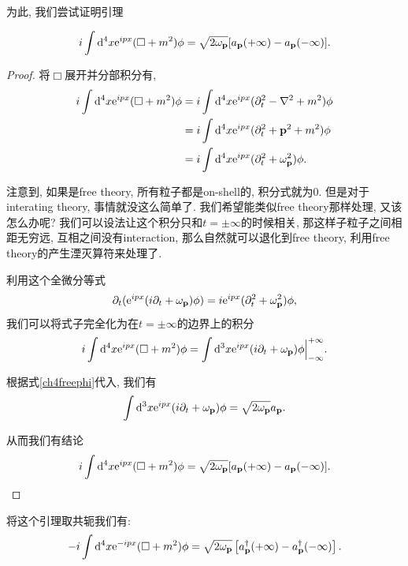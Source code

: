 为此, 我们尝试证明引理
\begin{lemma}
    \begin{equation}
        i\int\mathrm d^4x\mathrm e^{ipx}(\Box+m^2)\phi=\sqrt{2\omega_{\mathbf{p}}}[a_{\mathbf{p}}(+\infty)-a_{\mathbf{p}}(-\infty)].
    \end{equation}
\end{lemma}
\begin{proof}
    将$\Box$展开并分部积分有,
    \begin{align}
        i\int\mathrm d^4x\mathrm e^{ipx}(\Box+m^2)\phi&=i\int\mathrm d^4x\mathrm e^{ipx}(\partial_t^2-\nabla^2+m^2)\phi\\
        &=i\int\mathrm d^4x\mathrm e^{ipx}(\partial_t^2+\mathbf{p}^2+m^2)\phi\\
        &=i\int\mathrm d^4x\mathrm e^{ipx}(\partial_t^2+\omega_{\mathbf{p}}^2)\phi.
    \end{align}

    注意到, 如果是free theory, 所有粒子都是on-shell的, 积分式就为$0$. 但是对于interating theory, 事情就没这么简单了. 我们希望能类似free theory那样处理, 又该怎么办呢? 我们可以设法让这个积分只和$t=\pm\infty$的时候相关, 那这样子粒子之间相距无穷远, 互相之间没有interaction, 那么自然就可以退化到free theory, 利用free theory的产生湮灭算符来处理了.

    利用这个全微分等式\cite{schwartz-lsz}
    \begin{equation}
        \partial_t(\mathrm e^{ipx}(i\partial_t+\omega_{\mathbf{p}})\phi)=i\mathrm e^{ipx}(\partial_t^2+\omega_{\mathbf{p}}^2)\phi,
    \end{equation}
    我们可以将式子完全化为在$t=\pm\infty$的边界上的积分
    \begin{equation}
        i\int\mathrm d^4x\mathrm e^{ipx}(\Box+m^2)\phi=\int\mathrm d^3x\mathrm e^{ipx}(i\partial_t+\omega_{\mathbf{p}})\phi\Big|_{-\infty}^{+\infty}.
    \end{equation}

    根据式\eqref{ch4freephi}代入, 我们有
    \begin{equation}
        \int\mathrm d^3x\mathrm e^{ipx}(i\partial_t+\omega_{\mathbf{p}})\phi=\sqrt{2\omega_{\mathbf{p}}}a_{\mathbf{p}}.
    \end{equation}

    从而我们有结论
    \begin{equation}
        i\int\mathrm d^4x\mathrm e^{ipx}(\Box+m^2)\phi=\sqrt{2\omega_{\mathbf{p}}}[a_{\mathbf{p}}(+\infty)-a_{\mathbf{p}}(-\infty)].
    \end{equation}
\end{proof}

将这个引理取共轭我们有:
\begin{equation}
    -i\int\mathrm d^4x\mathrm e^{-ipx}(\Box+m^2)\phi=\sqrt{2\omega_{\mathbf{p}}}\left[a_{\mathbf{p}}^\dagger(+\infty)-a_{\mathbf{p}}^\dagger(-\infty)\right].
\end{equation}

